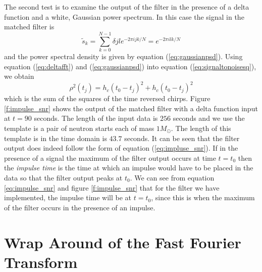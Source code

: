 The second test is to examine the output of the filter in the presence of a
delta function and a white, Gaussian power spectrum. In this case the signal
in the matched filter is
\begin{equation}
\tilde{s}_k = \sum_{k=0}^{N-1} \delta{jl} e^{-2\pi ijk/N} = e^{-2\pi ilk/N}
\label{eq:deltafft}
\end{equation}
and the power spectral density is given by equation (\ref{eq:gaussianpsd}).
Using equation (\ref{eq:deltafft}) and (\ref{eq:gaussianpsd}) into equation
(\ref{eq:signaltonoisesq}), we obtain
\begin{equation}
\rho^2(t_j) = h_c(t_0 - t_j)^2 + h_c(t_0 - t_j)^2
\label{eq:impulse_snr}
\end{equation}
which is the sum of the squares of the time reversed chirps.  Figure
\ref{f:impulse_snr} shows the output of the matched filter with a delta
function input at $t=90$ seconds. The length of the input data is $256$
seconds and we use the template is a pair of neutron starts each of
mass $1 M_\odot$. The length of this template is in the time domain is $43.7$
seconds.  It can be seen that the filter output does indeed follow the form of
equation (\ref{eq:impluse_snr}). If in the presence of a signal
the maximum of the filter output occurs at time $t = t_0$ then the
\emph{impulse time} is the time at which an impulse would have to be placed in
the data so that the filter output peaks at $t_0$. We can see from equation
\ref{eq:impulse_snr} and figure \ref{f:impulse_snr} that for the filter we
have implemented, the impulse time will be at $t = t_0$, since this is when
the maximum of the filter occurs in the presence of an impulse.

\section{Wrap Around of the Fast Fourier Transform}
\label{s:wraparound}

